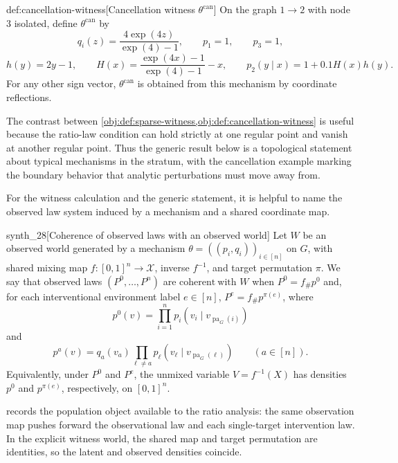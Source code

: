 \documentclass[11pt]{article}
\begin{document}
\begin{definitionv}{def:cancellation-witness}[Cancellation witness $\theta^{\mathrm{can}}$]
On the graph \(1\to2\) with node \(3\) isolated, define \(\theta^{\mathrm{can}}\) by
\[
q_i(z)=\frac{4\exp(4z)}{\exp(4)-1},
\qquad
p_1=1,
\qquad
p_3=1,
\]
\[
h(y)=2y-1,
\qquad
H(x)=\frac{\exp(4x)-1}{\exp(4)-1}-x,
\qquad
p_2(y\mid x)=1+0.1H(x)h(y).
\]
For any other sign vector, \(\theta^{\mathrm{can}}\) is obtained from this mechanism by coordinate reflections.
\end{definitionv}

The contrast between \cref{obj:def:sparse-witness,obj:def:cancellation-witness} is useful because the ratio-law condition can hold strictly at one regular point and vanish at another regular point. Thus the generic result below is a topological statement about typical mechanisms in the stratum, with the cancellation example marking the boundary behavior that analytic perturbations must move away from.

For the witness calculation and the generic statement, it is helpful to name the observed law system induced by a mechanism and a shared coordinate map.

\begin{definitionv}{synth_28}[Coherence of observed laws with an observed world]
Let \(W\) be an observed world generated by a mechanism \(\theta=((p_i,q_i))_{i\in[n]}\) on \(G\), with shared mixing map \(f:[0,1]^n\to\mathcal X\), inverse \(f^{-1}\), and target permutation \(\pi\). We say that observed laws \((P^0,\ldots,P^n)\) are \(\mathrm{coherent\ with}\) \(W\) when \(P^0=f_{\#}p^0\) and, for each interventional environment label \(e\in[n]\), \(P^e=f_{\#}p^{\pi(e)}\), where
\[
p^0(v)=\prod_{i=1}^{n}p_i(v_i\mid v_{\operatorname{pa}_G(i)})
\]
and
\[
p^a(v)=q_a(v_a)\prod_{\ell\ne a}p_\ell(v_\ell\mid v_{\operatorname{pa}_G(\ell)})
\qquad(a\in[n]).
\]
Equivalently, under \(P^0\) and \(P^e\), the unmixed variable \(V=f^{-1}(X)\) has densities \(p^0\) and \(p^{\pi(e)}\), respectively, on \([0,1]^n\).
\end{definitionv}

 records the population object available to the ratio analysis: the same observation map pushes forward the observational law and each single-target intervention law. In the explicit witness world, the shared map and target permutation are identities, so the latent and observed densities coincide.
\end{document}
